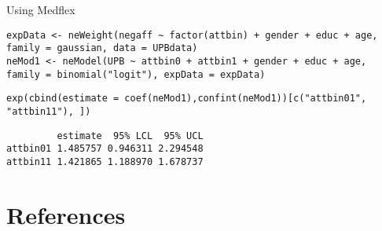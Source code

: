 \documentclass[12pt]{article}
\begin{document}
Using Medflex
\lstset{language=r,label= ,caption= ,captionpos=b,numbers=none}
\begin{lstlisting}
expData <- neWeight(negaff ~ factor(attbin) + gender + educ + age, family = gaussian, data = UPBdata)
neMod1 <- neModel(UPB ~ attbin0 + attbin1 + gender + educ + age, family = binomial("logit"), expData = expData)
\end{lstlisting}

\lstset{language=r,label= ,caption= ,captionpos=b,numbers=none}
\begin{lstlisting}
exp(cbind(estimate = coef(neMod1),confint(neMod1))[c("attbin01", "attbin11"), ])
\end{lstlisting}
\begin{verbatim}
         estimate  95% LCL  95% UCL
attbin01 1.485757 0.946311 2.294548
attbin11 1.421865 1.188970 1.678737
\end{verbatim}

\section{References}
\label{sec:org559036f}
\begingroup
\renewcommand{\section}[2]{}



\endgroup
\end{document}
